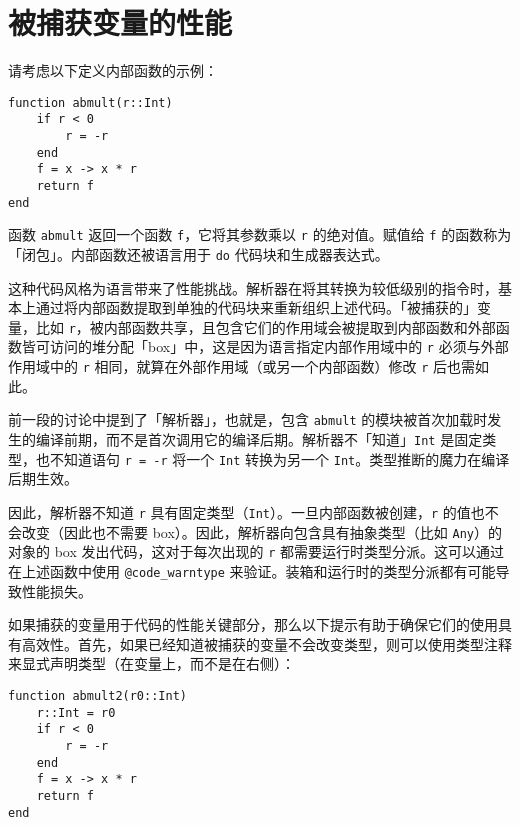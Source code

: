\hypertarget{16106323250273012356}{}


\section{被捕获变量的性能}



请考虑以下定义内部函数的示例：




\begin{verbatim}
function abmult(r::Int)
    if r < 0
        r = -r
    end
    f = x -> x * r
    return f
end
\end{verbatim}



函数 \texttt{abmult} 返回一个函数 \texttt{f}，它将其参数乘以 \texttt{r} 的绝对值。赋值给 \texttt{f} 的函数称为「闭包」。内部函数还被语言用于 \texttt{do} 代码块和生成器表达式。



这种代码风格为语言带来了性能挑战。解析器在将其转换为较低级别的指令时，基本上通过将内部函数提取到单独的代码块来重新组织上述代码。「被捕获的」变量，比如 \texttt{r}，被内部函数共享，且包含它们的作用域会被提取到内部函数和外部函数皆可访问的堆分配「box」中，这是因为语言指定内部作用域中的 \texttt{r} 必须与外部作用域中的 \texttt{r} 相同，就算在外部作用域（或另一个内部函数）修改 \texttt{r} 后也需如此。



前一段的讨论中提到了「解析器」，也就是，包含 \texttt{abmult} 的模块被首次加载时发生的编译前期，而不是首次调用它的编译后期。解析器不「知道」\texttt{Int} 是固定类型，也不知道语句 \texttt{r = -r} 将一个 \texttt{Int} 转换为另一个 \texttt{Int}。类型推断的魔力在编译后期生效。



因此，解析器不知道 \texttt{r} 具有固定类型（\texttt{Int}）。一旦内部函数被创建，\texttt{r} 的值也不会改变（因此也不需要 box）。因此，解析器向包含具有抽象类型（比如 \texttt{Any}）的对象的 box 发出代码，这对于每次出现的 \texttt{r} 都需要运行时类型分派。这可以通过在上述函数中使用 \texttt{@code\_warntype} 来验证。装箱和运行时的类型分派都有可能导致性能损失。



如果捕获的变量用于代码的性能关键部分，那么以下提示有助于确保它们的使用具有高效性。首先，如果已经知道被捕获的变量不会改变类型，则可以使用类型注释来显式声明类型（在变量上，而不是在右侧）：




\begin{verbatim}
function abmult2(r0::Int)
    r::Int = r0
    if r < 0
        r = -r
    end
    f = x -> x * r
    return f
end
\end{verbatim}



